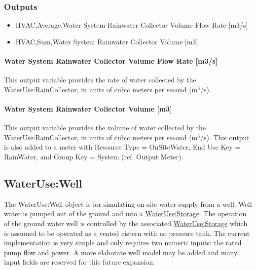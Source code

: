 \subsubsection{Outputs}\label{outputs-3-023}

\begin{itemize}
\item
  HVAC,Average,Water System Rainwater Collector Volume Flow Rate {[}m3/s{]}
\item
  HVAC,Sum,Water System Rainwater Collector Volume {[}m3{]}
\end{itemize}

\paragraph{Water System Rainwater Collector Volume Flow Rate {[}m3/s{]}}\label{water-system-rainwater-collector-volume-flow-rate-m3s}

This output variable provides the rate of water collected by the WaterUse:RainCollector, in units of cubic meters per second (m\(^{3}\)/s).

\paragraph{Water System Rainwater Collector Volume {[}m3{]}}\label{water-system-rainwater-collector-volume-m3}

This output variable provides the volume of water collected by the WaterUse:RainCollector, in units of cubic meters per second (m\(^{3}\)/s). This output is also added to a meter with Resource Type = OnSiteWater, End Use Key = RainWater, and Group Key = System (ref. Output Meter).

\subsection{WaterUse:Well}\label{waterusewell}

The WaterUse:Well object is for simulating on-site water supply from a well. Well water is pumped out of the ground and into a \hyperref[waterusestorage]{WaterUse:Storage}. The operation of the ground water well is controlled by the associated \hyperref[waterusestorage]{WaterUse:Storage} which is assumed to be operated as a vented cistern with no pressure tank. The current implementation is very simple and only requires two numeric inputs: the rated pump flow and power. A more elaborate well model may be added and many input fields are reserved for this future expansion.

